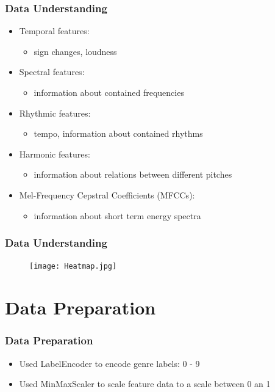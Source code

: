 \documentclass[10pt, aspectratio=169]{beamer}
\begin{document}
\begin{frame}
    \frametitle{Data Understanding}
    \begin{itemize}\setlength\itemsep{12pt}
        \item Temporal features: \begin{itemize}
            \item sign changes, loudness
        \end{itemize}
        \item Spectral features: \begin{itemize}
            \item information about contained frequencies
        \end{itemize}
        \item Rhythmic features: \begin{itemize}
            \item tempo, information about contained rhythms
        \end{itemize}
        \item Harmonic features: \begin{itemize}
            \item information about relations between different pitches
        \end{itemize}
        \item Mel-Frequency Cepstral Coefficients (MFCCs): \begin{itemize}
            \item information about short term energy spectra
        \end{itemize}
    \end{itemize}
\end{frame}

\begin{frame}
    \frametitle{Data Understanding}
    \begin{figure}
        \centering
        \texttt{[image: Heatmap.jpg]}
    \end{figure}
\end{frame}

\section{Data Preparation}
\begin{frame}
    \frametitle{Data Preparation}
    \begin{itemize}\setlength\itemsep{12pt}
        \item Used LabelEncoder to encode genre labels: 0 - 9
        \item Used MinMaxScaler to scale feature data to a scale between 0 an 1
    \end{itemize}
\end{frame}
\end{document}
